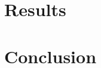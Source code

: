 \documentclass{article}
\begin{document}
	\section{Results}
	
	\section{Conclusion}
	
	\begin{thebibliography}{9}

		
	\end{thebibliography}  
\end{document}
